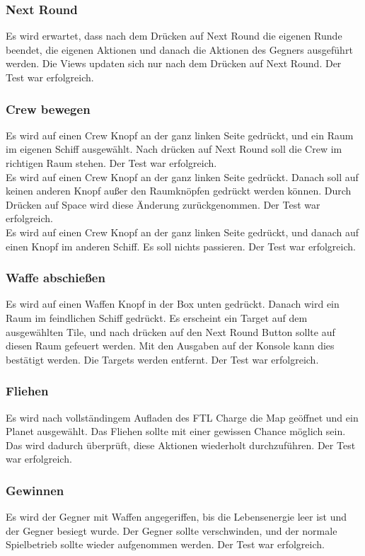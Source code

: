 \documentclass[fontsize=12pt,paper=a4,twoside]{scrartcl}
\begin{document}
\subsubsection{Next Round} 
Es wird erwartet, dass nach dem Drücken auf Next Round die eigenen Runde beendet, die eigenen Aktionen und danach die Aktionen des Gegners ausgeführt werden. Die Views updaten sich nur nach dem Drücken auf Next Round.  Der Test war erfolgreich. \\
\subsubsection{Crew bewegen}
Es wird auf einen Crew Knopf an der ganz linken Seite gedrückt, und ein Raum im eigenen Schiff ausgewählt. Nach drücken auf Next Round soll die Crew im richtigen Raum stehen. Der Test war erfolgreich. \\
Es wird auf einen Crew Knopf an der ganz linken Seite gedrückt. Danach soll auf keinen anderen Knopf außer den Raumknöpfen gedrückt werden können. Durch Drücken auf Space wird diese Änderung zurückgenommen.  Der Test war erfolgreich. \\
Es wird auf einen Crew Knopf an der ganz linken Seite gedrückt, und danach auf einen Knopf im anderen Schiff. Es soll nichts passieren. Der Test war erfolgreich. \\
\subsubsection{Waffe abschießen}
Es wird auf einen Waffen Knopf in der Box unten gedrückt. Danach wird ein Raum im feindlichen Schiff gedrückt. Es erscheint ein Target auf dem ausgewählten Tile, und nach drücken auf den Next Round Button sollte auf diesen Raum gefeuert werden. Mit den Ausgaben auf der Konsole kann dies bestätigt werden. Die Targets werden entfernt.  Der Test war erfolgreich. \\
\subsubsection{Fliehen}
Es wird nach vollständingem Aufladen des FTL Charge die Map geöffnet und ein Planet ausgewählt. Das Fliehen sollte mit einer gewissen Chance möglich sein. Das wird dadurch überprüft, diese Aktionen wiederholt durchzuführen. Der Test war erfolgreich. \\
\subsubsection{Gewinnen}
Es wird der Gegner mit Waffen angegeriffen, bis die Lebensenergie leer ist und der Gegner besiegt wurde. Der Gegner sollte verschwinden, und der normale Spielbetrieb sollte wieder aufgenommen werden.  Der Test war erfolgreich. \\
\end{document}
